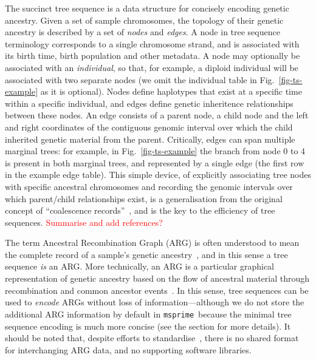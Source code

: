 \documentclass{article}
\newcommand{\msprime}[0]{\texttt{msprime}}
\newcommand{\jkcomment}[1]{\textcolor{red}{#1}}
\begin{document}
The succinct tree sequence is a data structure for concisely encoding
genetic ancestry. Given a set of sample chromosomes, the topology
of their genetic ancestry is described by a set of \emph{nodes}
and \emph{edges}. A node in tree sequence terminology corresponds
to a single chromosome strand, and is associated with its birth time,
birth population and other metadata. A node may optionally be
associated with an \emph{individual}, so that, for example, a diploid
individual will be associated with two separate nodes (we omit
the individual table in Fig.~\ref{fig-ts-example} as it is optional).
Nodes define haplotypes that exist at a specific time within a
specific individual, and edges define genetic inheritence
relationships between these nodes. An edge consists of a
parent node, a child node and the left and right coordinates
of the contiguous genomic interval over which
the child inherited genetic material from the parent.
Critically, edges can span multiple marginal trees: for
example, in Fig.~\ref{fig-ts-example} the branch from node
0 to 4 is present in both marginal trees, and represented
by a single edge (the first row in the example edge table).
This simple device, of explicitly associating tree nodes
with specific ancestral chromosomes and recording the
genomic intervals over which parent/child relationships exist,
is a generalisation from the original concept  of
``coalescence records''~\citep{kelleher2016efficient}, and
is the key to the efficiency of tree sequences.
\jkcomment{Summarise and add references?}

The term Ancestral Recombination Graph (ARG) is often understood
to mean the complete record of a sample's genetic
ancestry~\citep[e.g.][]{mathieson2020ancestry}, and in this sense a tree
sequence \emph{is} an ARG. More technically, an ARG is a particular
graphical representation of genetic ancestry based on the
flow of ancestral material through recombination and common
ancestor events~\citep{griffiths1991two,griffiths1997ancestral}.
In this sense, tree sequences can be used to \emph{encode}
ARGs without loss of information---although we do not store
the additional ARG information by default
in \msprime\ because the minimal tree sequence encoding is
much more concise (see the  section for more details).
It should be noted that, despite efforts to
standardise~\citep{cardona2008extended,mcgill2013graphml}, there is
no shared format for interchanging ARG data, and no supporting software
libraries.
\end{document}
